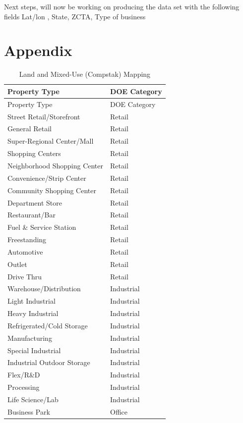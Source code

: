 \documentclass[
  12pt]{article}
\begin{document}
Next steps, will now be working on producing the data set with the
following fields Lat/lon , State, ZCTA, Type of business

\section{Appendix}\label{appendix}

\begin{longtable}[]{@{}ll@{}}
\caption{Land and Mixed-Use (Compstak)
Mapping}\label{tbl-Category_Mapping}\tabularnewline
\toprule\noalign{}
Property Type & DOE Category \\
\midrule\noalign{}
\endfirsthead
\toprule\noalign{}
Property Type & DOE Category \\
\midrule\noalign{}
\endhead
\bottomrule\noalign{}
\endlastfoot
Street Retail/Storefront & Retail \\
General Retail & Retail \\
Super-Regional Center/Mall & Retail \\
Shopping Centers & Retail \\
Neighborhood Shopping Center & Retail \\
Convenience/Strip Center & Retail \\
Community Shopping Center & Retail \\
Department Store & Retail \\
Restaurant/Bar & Retail \\
Fuel \& Service Station & Retail \\
Freestanding & Retail \\
Automotive & Retail \\
Outlet & Retail \\
Drive Thru & Retail \\
Warehouse/Distribution & Industrial \\
Light Industrial & Industrial \\
Heavy Industrial & Industrial \\
Refrigerated/Cold Storage & Industrial \\
Manufacturing & Industrial \\
Special Industrial & Industrial \\
Industrial Outdoor Storage & Industrial \\
Flex/R\&D & Industrial \\
Processing & Industrial \\
Life Science/Lab & Industrial \\
Business Park & Office \\

\end{longtable}
\end{document}
